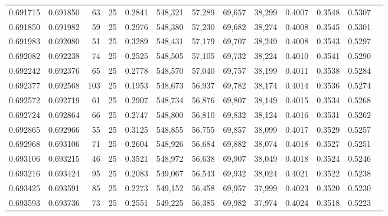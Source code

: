 \begin{tabular}{rrrrrrrrrrrrr}
0.691715 & 0.691850 &    63 &  25 &                                     0.2841 & 548,321 &  57,289 &  69,657 &  38,299 & 0.4007 & 0.3548 & 0.5307 \\
0.691850 & 0.691982 &    59 &  25 &                                     0.2976 & 548,380 &  57,230 &  69,682 &  38,274 & 0.4008 & 0.3545 & 0.5301 \\
0.691983 & 0.692080 &    51 &  25 &                                     0.3289 & 548,431 &  57,179 &  69,707 &  38,249 & 0.4008 & 0.3543 & 0.5297 \\
0.692082 & 0.692238 &    74 &  25 &                                     0.2525 & 548,505 &  57,105 &  69,732 &  38,224 & 0.4010 & 0.3541 & 0.5290 \\
0.692242 & 0.692376 &    65 &  25 &                                     0.2778 & 548,570 &  57,040 &  69,757 &  38,199 & 0.4011 & 0.3538 & 0.5284 \\
0.692377 & 0.692568 &   103 &  25 &                                     0.1953 & 548,673 &  56,937 &  69,782 &  38,174 & 0.4014 & 0.3536 & 0.5274 \\
0.692572 & 0.692719 &    61 &  25 &                                     0.2907 & 548,734 &  56,876 &  69,807 &  38,149 & 0.4015 & 0.3534 & 0.5268 \\
0.692724 & 0.692864 &    66 &  25 &                                     0.2747 & 548,800 &  56,810 &  69,832 &  38,124 & 0.4016 & 0.3531 & 0.5262 \\
0.692865 & 0.692966 &    55 &  25 &                                     0.3125 & 548,855 &  56,755 &  69,857 &  38,099 & 0.4017 & 0.3529 & 0.5257 \\
0.692968 & 0.693106 &    71 &  25 &                                     0.2604 & 548,926 &  56,684 &  69,882 &  38,074 & 0.4018 & 0.3527 & 0.5251 \\
0.693106 & 0.693215 &    46 &  25 &                                     0.3521 & 548,972 &  56,638 &  69,907 &  38,049 & 0.4018 & 0.3524 & 0.5246 \\
0.693216 & 0.693424 &    95 &  25 &                                     0.2083 & 549,067 &  56,543 &  69,932 &  38,024 & 0.4021 & 0.3522 & 0.5238 \\
0.693425 & 0.693591 &    85 &  25 &                                     0.2273 & 549,152 &  56,458 &  69,957 &  37,999 & 0.4023 & 0.3520 & 0.5230 \\
0.693593 & 0.693736 &    73 &  25 &                                     0.2551 & 549,225 &  56,385 &  69,982 &  37,974 & 0.4024 & 0.3518 & 0.5223 \\

\end{tabular}
